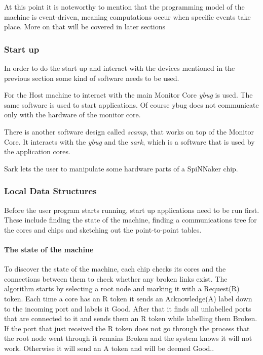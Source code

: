 \documentclass[12pt,a4paper]{article}
\begin{document}
At this point it is noteworthy to mention that the programming model of the machine is event-driven, meaning computations occur when specific events take place. More on that will be covered in later sections
\subsubsection{Start up}
In order to do the start up and interact with the devices mentioned in the previous section some kind of software needs to be used.

For the Host machine to interact with the main Monitor Core \emph{ybug} is used. The same software is used to start applications. Of course ybug does not communicate only with the hardware of the monitor core. 

There is another software design called \emph{scamp}, that works on top of the Monitor Core. It interacts with the \emph{ybug} and the \emph{sark}, which is a software that is used by the application cores. 

Sark lets the user to manipulate some hardware parts of a SpiNNaker chip.\cite{spinnweb}
\subsubsection{Local Data Structures}
Before the user program starts running, start up applications need to be run first. These include finding the state of the machine, finding a communications tree for the cores and chips and sketching out the point-to-point tables.

\paragraph{The state of the machine}
To discover the state of the machine, each chip checks its cores and the connections between them to check whether any broken links exist. The algorithm starts by selecting a root node and marking it with a Request(R) token. Each time a core has an R token it sends an Acknowledge(A) label down to the incoming port and labels it Good. After that it finds all unlabelled ports that are connected to it and sends them an R token while labelling them Broken. If the port that just received the R token does not go through the process that the root node went through it remains Broken and the system knows it will not work. Otherwise it will send an A token and will be deemed Good.\cite{jefflec}.
\end{document}
